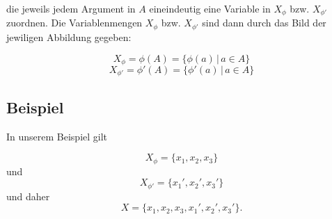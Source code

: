 die jeweils jedem Argument in $A$ eineindeutig eine Variable in
$X_{\phi}$ bzw. $X_{\phi'}$ zuordnen. Die Variablenmengen $X_{\phi}$
bzw. $X_{\phi'}$ sind dann durch das Bild der jewiligen Abbildung
gegeben:

\[ X_{\phi}  = \phi(A) = \{ \phi(a) \,|\, a \in A \} \]
\[ X_{\phi'}  = \phi'(A) = \{ \phi'(a) \,|\, a \in A \} \]

\subsection{Beispiel}\label{beispiel-1}

In unserem Beispiel gilt

\[ X_{\phi} = \{x_1,x_2,x_3\} \] und \[ X_{\phi'} = \{x_1',x_2',x_3'\}\]
und daher \[ X = \{x_1,x_2,x_3,x_1',x_2',x_3'\}.\]
